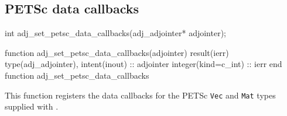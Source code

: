 \subsection{PETSc data callbacks}
\begin{framed}
\begin{minipage}{\columnwidth}
\begin{ccode}
  int adj_set_petsc_data_callbacks(adj_adjointer* adjointer);
\end{ccode}
\begin{fortrancode}
  function adj_set_petsc_data_callbacks(adjointer) result(ierr)
    type(adj_adjointer), intent(inout) :: adjointer
    integer(kind=c_int) :: ierr
  end function adj_set_petsc_data_callbacks
\end{fortrancode}
\end{minipage}
\end{framed}
This function registers the data callbacks for the PETSc \texttt{Vec} and \texttt{Mat} types
supplied with \libadjoint.

